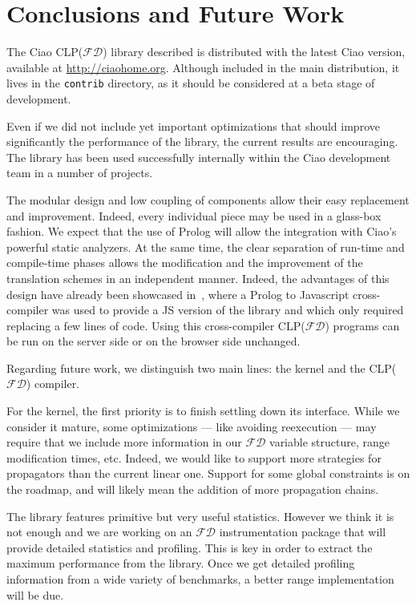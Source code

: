 \documentclass{llncs}
\newcommand{\clpfd}{CLP($\mathcal{FD}$)\xspace}
\newcommand{\fd}{$\mathcal{FD}$\xspace}
\begin{document}
\section{Conclusions and Future Work}
\label{sec:conclusions}

The Ciao \clpfd library described is distributed with the latest Ciao
version, available at \url{http://ciaohome.org}. Although included in
the main distribution, it lives in the \verb!contrib! directory, as it
should be considered at a beta stage of development.

Even if we did not include yet important optimizations that should
improve significantly the performance of the library, the current
results are encouraging. The library has been used successfully 
internally within the Ciao development team in a number of projects.

The modular design and low coupling of components allow their easy
replacement and improvement. Indeed, every individual piece may be
used in a glass-box fashion. We expect that the use of Prolog will
allow the integration with Ciao's powerful static analyzers. At the
same time, the clear separation of run-time and compile-time phases
allows the modification and the improvement of the translation schemes
in an independent manner.  Indeed, the advantages of this design have
already been showcased in~\cite{clp-to-js-iclp12}, where a Prolog to
Javascript cross-compiler was used to provide a JS version of the
library and which only required replacing a few lines of code.  Using
this cross-compiler \clpfd programs can be run on the server side or
on the browser side unchanged.

Regarding future work, we distinguish two main lines: the kernel and
the \clpfd compiler.

For the kernel, the first priority is to finish settling down its
interface. While we consider it mature, some optimizations --- like
avoiding reexecution --- may require that we include more information
in our \fd variable structure, range modification times, etc.  Indeed,
we would like to support more strategies for propagators than the
current linear one. Support for some global constraints is on the
roadmap, and will likely mean the addition of more propagation chains.

The library features primitive but very useful statistics. However we
think it is not enough and we are working on an \fd instrumentation
package that will provide detailed statistics and profiling. This is
key in order to extract the maximum performance from the library.
Once we get detailed profiling information from a wide variety of
benchmarks, a better range implementation will be due.
\end{document}
